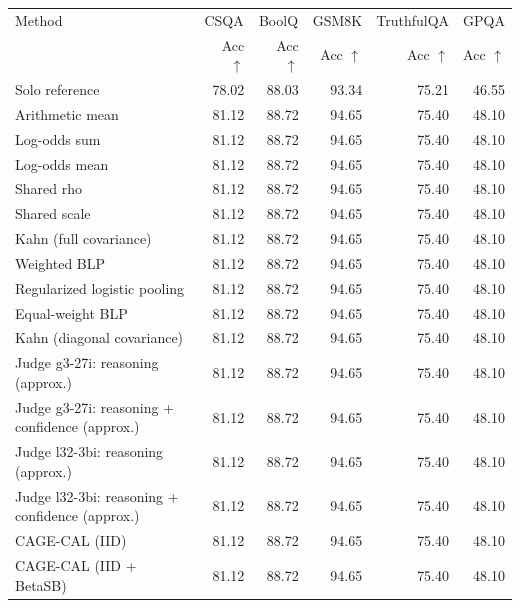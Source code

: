 \begin{tabular}{lrrrrr}
\toprule
Method & \multicolumn{1}{c}{CSQA} & \multicolumn{1}{c}{BoolQ} & \multicolumn{1}{c}{GSM8K} & \multicolumn{1}{c}{TruthfulQA} & \multicolumn{1}{c}{GPQA} \\
 & Acc $\uparrow$ & Acc $\uparrow$ & Acc $\uparrow$ & Acc $\uparrow$ & Acc $\uparrow$ \\
\midrule
Solo reference & 78.02 & 88.03 & 93.34 & 75.21 & 46.55 \\
Arithmetic mean & 81.12 & 88.72 & 94.65 & 75.40 & 48.10 \\
Log-odds sum & 81.12 & 88.72 & 94.65 & 75.40 & 48.10 \\
Log-odds mean & 81.12 & 88.72 & 94.65 & 75.40 & 48.10 \\
Shared rho & 81.12 & 88.72 & 94.65 & 75.40 & 48.10 \\
Shared scale & 81.12 & 88.72 & 94.65 & 75.40 & 48.10 \\
Kahn (full covariance) & 81.12 & 88.72 & 94.65 & 75.40 & 48.10 \\
Weighted BLP & 81.12 & 88.72 & 94.65 & 75.40 & 48.10 \\
Regularized logistic pooling & 81.12 & 88.72 & 94.65 & 75.40 & 48.10 \\
Equal-weight BLP & 81.12 & 88.72 & 94.65 & 75.40 & 48.10 \\
Kahn (diagonal covariance) & 81.12 & 88.72 & 94.65 & 75.40 & 48.10 \\
Judge g3-27i: reasoning (approx.) & 81.12 & 88.72 & 94.65 & 75.40 & 48.10 \\
Judge g3-27i: reasoning + confidence (approx.) & 81.12 & 88.72 & 94.65 & 75.40 & 48.10 \\
Judge l32-3bi: reasoning (approx.) & 81.12 & 88.72 & 94.65 & 75.40 & 48.10 \\
Judge l32-3bi: reasoning + confidence (approx.) & 81.12 & 88.72 & 94.65 & 75.40 & 48.10 \\
CAGE-CAL (IID) & 81.12 & 88.72 & 94.65 & 75.40 & 48.10 \\
CAGE-CAL (IID + BetaSB) & 81.12 & 88.72 & 94.65 & 75.40 & 48.10 \\
\bottomrule
\end{tabular}
